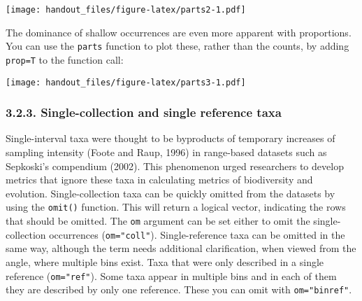 \documentclass[]{article}
\newenvironment{Shaded}{\begin{snugshade}}{\end{snugshade}}
\newcommand{\DataTypeTok}[1]{\textcolor[rgb]{0.13,0.29,0.53}{#1}}
\newcommand{\DecValTok}[1]{\textcolor[rgb]{0.00,0.00,0.81}{#1}}
\newcommand{\FloatTok}[1]{\textcolor[rgb]{0.00,0.00,0.81}{#1}}
\newcommand{\KeywordTok}[1]{\textcolor[rgb]{0.13,0.29,0.53}{\textbf{#1}}}
\newcommand{\NormalTok}[1]{#1}
\newcommand{\OperatorTok}[1]{\textcolor[rgb]{0.81,0.36,0.00}{\textbf{#1}}}
\newcommand{\StringTok}[1]{\textcolor[rgb]{0.31,0.60,0.02}{#1}}
\begin{document}
\texttt{[image: handout\_files/figure-latex/parts2-1.pdf]}

The dominance of shallow occurrences are even more apparent with
proportions. You can use the \texttt{parts} function to plot these,
rather than the counts, by adding \texttt{prop=T} to the function call:

\begin{Shaded}
\end{Shaded}

\texttt{[image: handout\_files/figure-latex/parts3-1.pdf]}

\hypertarget{single-collection-and-single-reference-taxa}{%
\subsubsection{3.2.3. Single-collection and single reference
taxa}\label{single-collection-and-single-reference-taxa}}

Single-interval taxa were thought to be byproducts of temporary
increases of sampling intensity (Foote and Raup, 1996) in range-based
datasets such as Sepkoski's compendium (2002). This phenomenon urged
researchers to develop metrics that ignore these taxa in calculating
metrics of biodiversity and evolution. Single-collection taxa can be
quickly omitted from the datasets by using the \texttt{omit()} function.
This will return a logical vector, indicating the rows that should be
omitted. The \texttt{om} argument can be set either to omit the
single-collection occurrences (\texttt{om="coll"}). Single-reference
taxa can be omitted in the same way, although the term needs additional
clarification, when viewed from the angle, where multiple bins exist.
Taxa that were only described in a single reference (\texttt{om="ref"}).
Some taxa appear in multiple bins and in each of them they are described
by only one reference. These you can omit with \texttt{om="binref"}.
\end{document}
